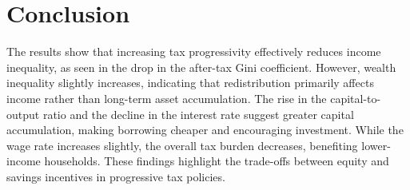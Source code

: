 \documentclass{article}
\begin{document}
\section{Conclusion}

The results show that increasing tax progressivity effectively reduces income inequality, as seen in the drop in the after-tax Gini coefficient. However, wealth inequality slightly increases, indicating that redistribution primarily affects income rather than long-term asset accumulation. The rise in the capital-to-output ratio and the decline in the interest rate suggest greater capital accumulation, making borrowing cheaper and encouraging investment. While the wage rate increases slightly, the overall tax burden decreases, benefiting lower-income households. These findings highlight the trade-offs between equity and savings incentives in progressive tax policies.
\end{document}
